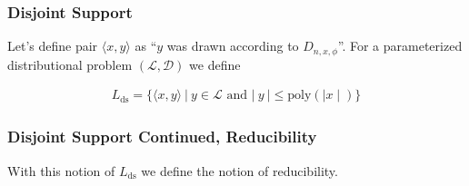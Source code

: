 \begin{frame}
    \frametitle{Disjoint Support}

    Let's define pair $\langle x, y \rangle$ as ``$y$ was drawn according to $D_{n,x,\phi}$''.
    For a parameterized distributional problem $(\mathcal{L}, \mathcal{D})$ we define


    \begin{align*}
        L_{\text{ds}} = \{\langle x, y \rangle \: \vert \: y \in \mathcal{L} \text{ and } \vert \: y \: \vert \leq \text{poly}(\mid x\mid)\}
    \end{align*}

\end{frame}

\begin{frame}
    \frametitle{Disjoint Support Continued, Reducibility}

    With this notion of $L_{\text{ds}}$ we define the notion of reducibility.

\end{frame}